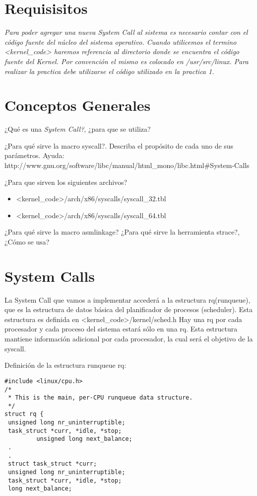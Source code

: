 \section{Requisisitos}
\textit{
Para poder agregar una nueva System Call al sistema es necesario contar con el 
código fuente del núcleo del sistema operativo. Cuando utilicemos el termino 
<kernel\_code> haremos referencia al directorio donde se encuentra el código fuente 
del Kernel.  Por convención el mismo es colocado en /usr/src/linux.  Para realizar 
la practica debe utilizarse el código utilizado en la practica 1.}
\section{Conceptos Generales}
\begin{questions}
  \question ¿Qué es una \textit{System Call?}, ¿para que se utiliza?

  \question ¿Para qué sirve la macro syscall?. Describa el propósito de cada uno 
            de sus parámetros. 
            Ayuda: http://www.gnu.org/software/libc/manual/html\_mono/libc.html\#System-Calls

   \question ¿Para que sirven los siguientes archivos? 
   \begin{itemize}  
   \item <kernel\_code>/arch/x86/syscalls/syscall\_32.tbl
   \item <kernel\_code>/arch/x86/syscalls/syscall\_64.tbl
   \end{itemize}
   \question ¿Para qué sirve la macro asmlinkage?
   \question ¿Para qué sirve la herramienta strace?, ¿Cómo se usa?
\end{questions}
\section{System Calls}

La System Call que vamos a implementar accederá a la estructura rq(runqueue), que es la estructura
de datos básica del planificador de procesos (scheduler). Esta estructura es definida en 
<kernel\_code>/kernel/sched.h Hay una rq por cada procesador y cada proceso del sistema estará sólo 
en una rq. Esta estructura mantiene información adicional por cada procesador, la cual será el objetivo
de la syscall.

Definición de la estructura runqueue rq:
\begin{verbatim}
#include <linux/cpu.h>
/*
 * This is the main, per-CPU runqueue data structure.
 */
struct rq {
 unsigned long nr_uninterruptible;
 task_struct *curr, *idle, *stop;
         unsigned long next_balance;
 .
 .
 struct task_struct *curr;
 unsigned long nr_uninterruptible;
 task_struct *curr, *idle, *stop;
 long next_balance;
\end{verbatim}



